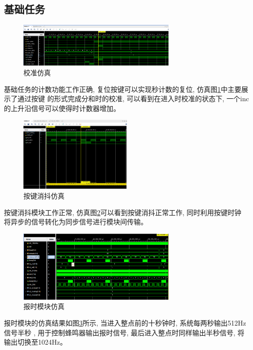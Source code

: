 \documentclass{article}
\begin{document}
\subsection*{基础任务}
\begin{figure}[htbp]
    \centering
    \includegraphics[width=0.7\textwidth]{image/2024-06-24-16-50-03.png}
    \caption{校准仿真}
    \label{image_base_sim_1}
\end{figure}
基础任务的计数功能工作正确, 复位按键可以实现秒计数的复位, 仿真图\ref{image_base_sim_1}中主要展示了通过按键
的形式完成分和时的校准, 可以看到在进入时校准的状态下, 一个inc的上升沿信号可以使得时计数器增加。\\
\newpage
\begin{figure}[htbp]
    \centering
    \includegraphics[width=0.5\textwidth]{image/2024-06-24-21-06-19.png}
    \caption{按键消抖仿真}
    \label{image_base_sim_2}
\end{figure}
按键消抖模块工作正常, 仿真图\ref{image_base_sim_2}可以看到按键消抖正常工作, 同时利用按键时钟
将异步的信号转化为同步信号进行模块间传输。\\

\begin{figure}[htbp]
    \centering
    \includegraphics[width=0.7\textwidth]{image/2024-06-25-22-48-35.png}
    \caption{报时模块仿真}
    \label{image_tellTime_sim_1}
\end{figure}
报时模块的仿真结果如图\ref{image_tellTime_sim_1}所示, 当进入整点前的十秒钟时, 系统每两秒输出512Hz信号半秒
, 用于控制蜂鸣器输出报时信号, 最后进入整点时同样输出半秒信号, 将输出切换至1024Hz。\\
\end{document}

